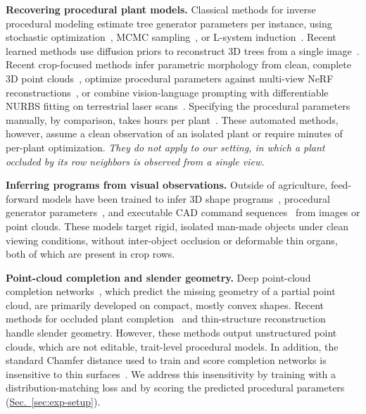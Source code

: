 \documentclass[10pt,twocolumn,letterpaper]{article}
\newcommand{\secref}[1]{\hyperref[#1]{Sec.~\ref*{#1}}}
\begin{document}
\noindent\textbf{Recovering procedural plant models.}
Classical methods for inverse procedural modeling estimate tree generator parameters per instance, using stochastic optimization~\citep{stava2014ipmtrees}, MCMC sampling~\citep{talton2011metropolis}, or L-system induction~\citep{guo2020ipmlsys,latentlsys2023}. Recent learned methods use diffusion priors to reconstruct 3D trees from a single image~\citep{svdtree2024,lee2024treedfusion}. Recent crop-focused methods infer parametric morphology from clean, complete 3D point clouds~\citep{demeter2025,ghrer2025paramplants}, optimize procedural parameters against multi-view NeRF reconstructions~\citep{cropcraft2026}, or combine vision-language prompting with differentiable NURBS fitting on terrestrial laser scans~\citep{hadadi2026vlmmaize,nurbsdiff2022}. Specifying the procedural parameters manually, by comparison, takes hours per plant~\citep{floraforge2026}. These automated methods, however, assume a clean observation of an isolated plant or require minutes of per-plant optimization. \textit{They do not apply to our setting, in which a plant occluded by its row neighbors is observed from a single view.}


\noindent\textbf{Inferring programs from visual observations.}
Outside of agriculture, feed-forward models have been trained to infer 3D shape programs~\citep{shapeprograms2019}, procedural generator parameters~\citep{zhao2025dipcg}, and executable CAD command sequences~\citep{text2cad2024,kolodiazhnyi2025cadrille} from images or point clouds. These models target rigid, isolated man-made objects under clean viewing conditions, without inter-object occlusion or deformable thin organs, both of which are present in crop rows.

\noindent\textbf{Point-cloud completion and slender geometry.}
Deep point-cloud completion networks~\citep{yuan2018pcn,yu2021pointr,yu2023adapointr,cai2024einet}, which predict the missing geometry of a partial point cloud, are primarily developed on compact, mostly convex shapes. Recent methods for occluded plant completion~\citep{lee2026occ} and thin-structure reconstruction~\citep{curvegaussian2025,qi2026rethinking} handle slender geometry. However, these methods output unstructured point clouds, which are not editable, trait-level procedural models. In addition, the standard Chamfer distance used to train and score completion networks is insensitive to thin surfaces~\citep{wu2021dcd,song2026structural,lin2023infocd}. We address this insensitivity by training with a distribution-matching loss and by scoring the predicted procedural parameters (\secref{sec:exp-setup}).
\end{document}
